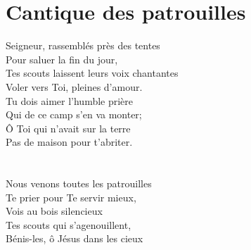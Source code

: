 \section*{Cantique des patrouilles}
Seigneur, rassemblés près des tentes\\
Pour saluer la fin du jour,\\
Tes scouts laissent leurs voix chantantes\\
Voler vers Toi, pleines d'amour.\\
Tu dois aimer l'humble prière\\
Qui de ce camp s'en va monter;\\
Ô Toi qui n'avait sur la terre\\
Pas de maison pour t'abriter.\\
\\\\
Nous venons toutes les patrouilles\\
Te prier pour Te servir mieux,\\
Vois au bois silencieux\\
Tes scouts qui s'agenouillent,\\
Bénis-les, ô Jésus dans les cieux\\